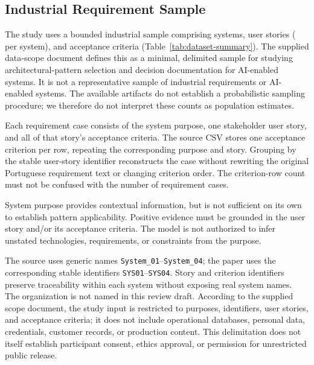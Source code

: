 \subsection{Industrial Requirement Sample}
\label{sec:requirement-sample}

The study uses a bounded industrial sample comprising
\StudySystemCount{} systems, \StudyStoryCount{} user stories
(\StudyStoriesPerSystem{} per system), and \StudyCriterionCount{} acceptance
criteria (Table~\ref{tab:dataset-summary}). The supplied data-scope document
defines this as a minimal, delimited sample for studying architectural-pattern
selection and decision documentation for AI-enabled systems. It is not a
representative sample of industrial requirements or AI-enabled systems.
The available artifacts do not establish a probabilistic sampling procedure;
we therefore do not interpret these counts as population estimates.



Each requirement case consists of the system purpose, one stakeholder user
story, and all of that story's acceptance criteria. The source CSV stores one
acceptance criterion per row, repeating the corresponding purpose and story.
Grouping by the stable user-story identifier reconstructs the case without
rewriting the original Portuguese requirement text or changing criterion order.
The criterion-row count must not be confused with the number of requirement
cases.

System purpose provides contextual information, but is not sufficient on its
own to establish pattern applicability. Positive evidence must be grounded in
the user story and/or its acceptance criteria. The model is not authorized to
infer unstated technologies, requirements, or constraints from the purpose.

The source uses generic names \texttt{System\_01}--\texttt{System\_04}; the
paper uses the corresponding stable identifiers \texttt{SYS01}--\texttt{SYS04}.
Story and criterion identifiers preserve traceability within each system
without exposing real system names. The organization is not named in this
review draft. According to the supplied scope document, the study input is
restricted to purposes, identifiers, user stories, and acceptance criteria;
it does not include operational databases, personal data, credentials, customer
records, or production content. This delimitation does not itself establish
participant consent, ethics approval, or permission for unrestricted public
release.

